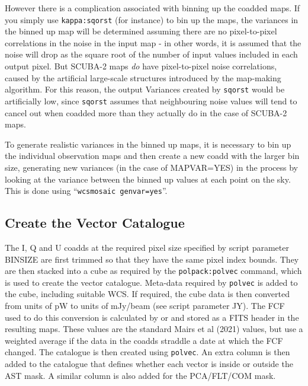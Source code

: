 \documentclass[twoside,11pt]{starlink}
\begin{document}
However there is a complication associated with binning up the coadded
maps. If you simply use \texttt{kappa:sqorst} (for instance) to bin up
the maps, the variances in the binned up map will be determined assuming
there are no pixel-to-pixel correlations in the noise in the input map -
in other words, it is assumed that the noise will drop as the square root
of the number of input values included in each output pixel. But SCUBA-2
maps \emph{do} have pixel-to-pixel noise correlations, caused by the artificial
large-scale structures introduced by the map-making algorithm. For this
reason, the output Variances created by \texttt{sqorst} would be
artificially low, since \texttt{sqorst} assumes that neighbouring noise
values will tend to cancel out when coadded more than they actually do in
the case of SCUBA-2 maps.

To generate realistic variances in the binned up maps, it is necessary to
bin up the individual observation maps and then create a new coadd with the
larger bin size, generating new variances (in the case of MAPVAR=YES) in
the process by looking at the variance between the binned up values at
each point on the sky. This is done using ``\texttt{wcsmosaic
genvar=yes}''.

\subsection{Create the Vector Catalogue}
The I, Q and U coadds at the required pixel size specified by script
parameter BINSIZE are first trimmed so that they have the same pixel
index bounds. They are then stacked into a cube as required by the
\texttt{polpack:polvec} command, which is used to create the vector
catalogue. Meta-data required by \texttt{polvec} is added to the cube,
including suitable WCS. If required, the cube data is then converted from
units of pW to units of mJy/beam (see script parameter JY). The FCF used
to do this conversion is calculated by \mmap or
\sloop and stored as a FITS header in the resulting maps. These
values are the standard Mairs et al (2021) values, but use a weighted
average if the data in the coadds straddle a date at which the FCF changed.
The catalogue is then created using \texttt{polvec}. An extra column is
then added to the catalogue that defines whether each vector is inside or
outside the AST mask. A similar column is also added for the PCA/FLT/COM
mask.
\end{document}
